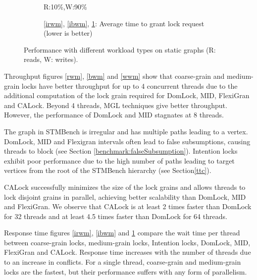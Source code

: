 \begin{figure}[ht]
\begin{subfigure}[b]{.32\textwidth}
		\caption{R:10\%,W:90\%}
		\label{iwwm}
	\end{subfigure}
	\begin{subfigure}[b]{\textwidth}
		\caption*{\ref{irwm}, \ref{ibwm}, \ref{iwwm}: Average time to grant lock request (lower is better)}
	\end{subfigure}



	\caption{Performance with different workload types on static graphs (R: reads, W: writes).}
	\label{staticPerf}
	\end{figure}
Throughput figures \ref{rwm}, \ref{bwm} and \ref{wwm} show that coarse-grain and medium-grain locks have better throughput for up to 4 concurrent threads due to the additional computation of the lock grain required for DomLock, MID, FlexiGran and CALock. Beyond 4 threads, MGL techniques give better throughput. However, the performance of DomLock and MID stagnates at 8 threads.

The graph in STMBench is irregular and has multiple paths leading to a vertex. DomLock, MID and Flexigran intervals often lead to false subsumptions, causing threads to block (see Section \ref{benchmark:falseSubsumption}). Intention locks exhibit poor performance due to the high number of paths leading to target vertices from the root of the STMBench hierarchy (see Section\ref{ttc}).

CALock successfully minimizes the size of the lock grains and allows threads to lock disjoint grains in parallel, achieving better scalability than DomLock, MID and FlexiGran.
We observe that CALock is at least 2 times faster than DomLock for 32 threads and at least 4.5 times faster than DomLock for 64 threads.




Response time figures \ref{irwm}, \ref{ibwm} and \ref{iwwm} compare the wait time per thread between coarse-grain locks, medium-grain locks, Intention locks,  DomLock, MID, FlexiGran and CALock.
Response time increases with the number of threads due to an increase in conflicts.
For a single thread, coarse-grain and medium-grain locks are the fastest, but their performance suffers with any form of parallelism. 

